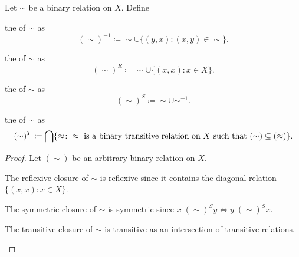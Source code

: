 \begin{definition}\label{def:derived_relations}
  Let \( \sim \) be a binary relation on \( X \). Define
  \begin{defenum}
     the  of \( \sim \) as
    \begin{equation*}
      (\sim)^{-1} \coloneqq \sim \cup \{ (y, x) \colon (x, y) \in \sim \}.
    \end{equation*}

     the  of \( \sim \) as
    \begin{equation*}
      (\sim)^R \coloneqq \sim \cup \{ (x, x) \colon x \in X \}.
    \end{equation*}

     the  of \( \sim \) as
    \begin{equation*}
      (\sim)^S \coloneqq \sim \cup \sim^{-1}.
    \end{equation*}

     the  of \( \sim \) as
    \begin{equation*}
      (\sim)^T \coloneqq \bigcap \{ \approx \colon \approx \text{ is a binary transitive relation on \( X \) such that } (\sim) \subseteq (\approx) \}.
    \end{equation*}
  \end{defenum}
\end{definition}
\begin{proof}
  Let \( (\sim) \) be an arbitrary binary relation on \( X \).

  \begin{description}
     The reflexive closure of \( \sim \) is reflexive since it contains the diagonal relation \( \{ (x, x) \colon x \in X \} \).

     The symmetric closure of \( \sim \) is symmetric since \( x \;(\sim)^S y \iff y \;(\sim)^S x \).

     The transitive closure of \( \sim \) is transitive as an intersection of transitive relations.
  \end{description}
\end{proof}
